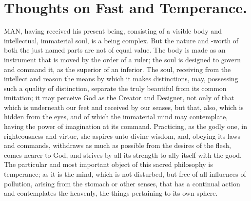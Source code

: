 \chapter{Thoughts on Fast and Temperance.}

MAN, having received his present being, 
consisting of a visible body and intellectual,
immaterial soul, is a being complex. 
But the nature and -worth of both the just 
named parts are not of equal value. The body
is made as an instrument that is moved by the 
order of a ruler; the soul is designed to govern 
and command it, as the superior of an inferior. 
The soul, receiving from the intellect and reason
the means by which it makes distinctions, 
may, possessing such a quality of distinction, 
separate the truly beautiful from its common 
imitation; it may perceive God as the Creator 
and Designer, not only of that which is underneath
our feet and received by our senses, but 
that, also, which is hidden from the eyes, and 
of which the immaterial mind may contemplate, 
having the power of imagination at its command. 
Practicing, as the godly one, in righteousness 
and virtue, she aspires unto divine wisdom, and, 
obeying its laws and commands, withdraws as 
much as possible from the desires of the flesh, 
comes nearer to God, and strives by all its 
strength to ally itself with the good. The 
particular and most important object of this 
sacred philosophy is temperance; as it is the 
mind, which is not disturbed, but free of all influences
of pollution, arising from the stomach 
or other senses, that has a continual action and 
contemplates the heavenly, the things pertaining
to its own sphere. 

